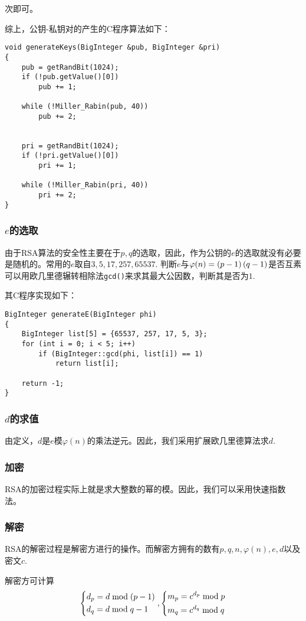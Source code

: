 次即可。\par
综上，公钥-私钥对的产生的C程序算法如下：
\begin{prove}
\begin{verbatim}
void generateKeys(BigInteger &pub, BigInteger &pri)
{
    pub = getRandBit(1024);
    if (!pub.getValue()[0])
        pub += 1;
    
    while (!Miller_Rabin(pub, 40))
        pub += 2;
    
    
    pri = getRandBit(1024);
    if (!pri.getValue()[0])
        pri += 1;
    
    while (!Miller_Rabin(pri, 40))
        pri += 2;
}
\end{verbatim}
\end{prove}
\subsubsection{$e$的选取}
由于RSA算法的安全性主要在于$p, q$的选取，因此，作为公钥的$e$的选取就没有必要是随机的。常用的$e$取自$3,5,17,257,65537$. 判断$e$与$\varphi(n)=\left( {p-1}\right)\left( {q-1}\right)$是否互素可以用欧几里德辗转相除法\verb`gcd()`来求其最大公因数，判断其是否为$1$.\par
其C程序实现如下：
\begin{prove}
\begin{verbatim}
BigInteger generateE(BigInteger phi)
{
    BigInteger list[5] = {65537, 257, 17, 5, 3};
    for (int i = 0; i < 5; i++)
        if (BigInteger::gcd(phi, list[i]) == 1)
            return list[i];
    
    return -1;
}
\end{verbatim}
\end{prove}
\subsubsection{$d$的求值}
由定义，$d$是$e$模$\varphi(n)$的乘法逆元。因此，我们采用扩展欧几里德算法求$d$.
\subsubsection{加密}
RSA的加密过程实际上就是求大整数的幂的模。因此，我们可以采用快速指数法。
\subsubsection{解密}
RSA的解密过程是解密方进行的操作。而解密方拥有的数有$p, q, n, \varphi(n), e, d$以及密文$c$.\par
解密方可计算
\begin{equation}
\begin{dcases}d_p=d\bmod{\left( {p-1}\right)}\\d_q=d\bmod{q-1}\end{dcases}, \begin{dcases}m_p=c^{d_p}\bmod{p}\\m_q=c^{d_q}\bmod{q}\end{dcases}
\end{equation}

